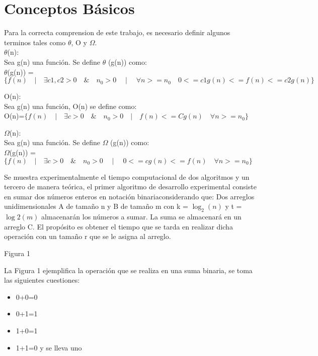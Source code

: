 \documentclass[spanish]{article}
\begin{document}
	\section{Conceptos B\'asicos}
	Para la correcta comprension de este trabajo, es necesario definir algunos terminos tales como $\theta$, O y $\Omega$.\\
	 $\theta$(n):\\
		Sea g(n) una función. Se define  $\theta$ (g(n)) como:\\
		
		 	$\theta$(g(n)) = $\{ f(n) \quad | \quad \exists c1,c2>0 \quad \& \quad n_{0}>0 \quad \mid \quad \forall n>=n_{0} \quad 0<= c1g(n) <= f(n) <= c2g(n) \}$
	\bigskip		 	
		 	
	O(n):\\
		Sea  g(n)  una función, O(n) se define como:\\
		
			\hspace{1cm}O(n)=$\{f(n) \quad | \quad \exists c >0 \quad \& \quad n_{0}>0 \quad | \quad f(n) <= Cg(n) \quad \forall  n>= n_{0} \}$
	\bigskip
	
	$\Omega$(n):\\
	Sea  g(n)  una función. Se define $\Omega$ (g(n)) como:\\

		\hspace{1cm}$\Omega$(g(n)) =$\{f(n) \quad | \quad \exists c >0 \quad \& \quad n_{0}>0 \quad \mid \quad  0<= cg(n)<= f(n) \quad \forall n>= n_{0} \}$
	\bigskip

	Se muestra experimentalmente el tiempo computacional de dos algoritmos y un tercero de manera teórica, 
	el primer algoritmo de desarrollo experimental consiste en sumar dos números enteros en notación binariaconsiderando que: 
	Dos arreglos unidimensionales A de tamaño n y B de tamaño m con k = $\log_{2}(n)$ y t = $\log{2}(m)$ almacenarán los números a sumar. 
	La suma se almacenará en un arreglo C. El propósito es obtener el tiempo que se tarda en realizar dicha operación con un tamaño r que se le asigna al arreglo.
	
	\begin{center}
		Figura 1
	\end{center}
	
La Figura 1 ejemplifica la operación que se realiza en una suma binaria, se toma las siguientes cuestiones:\\
\begin{itemize}
	\item 0+0=0
\item 0+1=1
\item 1+0=1
\item 1+1=0 y se lleva uno
\end{itemize}
\end{document}
